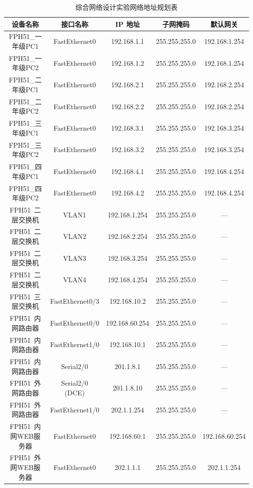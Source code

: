 \documentclass[UTF8,12pt,a4paper]{ctexart}
\begin{document}
\begin{table}[H]
\centering
\caption{综合网络设计实验网络地址规划表}
\renewcommand{\arraystretch}{1.2}
\begin{tabular}{ccccc}
\hline
设备名称 & 接口名称 & IP 地址 & 子网掩码 & 默认网关 \\
\hline

FPH51\_一年级PC1 & FastEthernet0 & 192.168.1.1 & 255.255.255.0 & 192.168.1.254 \\
FPH51\_一年级PC2 & FastEthernet0 & 192.168.1.2 & 255.255.255.0 & 192.168.1.254 \\

FPH51\_二年级PC1 & FastEthernet0 & 192.168.2.1 & 255.255.255.0 & 192.168.2.254 \\
FPH51\_二年级PC2 & FastEthernet0 & 192.168.2.2 & 255.255.255.0 & 192.168.2.254 \\

FPH51\_三年级PC1 & FastEthernet0 & 192.168.3.1 & 255.255.255.0 & 192.168.3.254 \\
FPH51\_三年级PC2 & FastEthernet0 & 192.168.3.2 & 255.255.255.0 & 192.168.3.254 \\

FPH51\_四年级PC1 & FastEthernet0 & 192.168.4.1 & 255.255.255.0 & 192.168.4.254 \\
FPH51\_四年级PC2 & FastEthernet0 & 192.168.4.2 & 255.255.255.0 & 192.168.4.254 \\


FPH51\ 二层交换机 & VLAN1 & 192.168.1.254 & 255.255.255.0 & — \\
FPH51\ 二层交换机 & VLAN2 & 192.168.2.254 & 255.255.255.0 & — \\
FPH51\ 二层交换机 & VLAN3 & 192.168.3.254 & 255.255.255.0 & — \\
FPH51\ 二层交换机 & VLAN4 & 192.168.4.254 & 255.255.255.0 & — \\
FPH51\ 三层交换机 & FastEthernet0/3 & 192.168.10.2 & 255.255.255.0 & — \\


FPH51\ 内网路由器 & FastEthernet0/0 & 192.168.60.254 & 255.255.255.0 & — \\
FPH51\ 内网路由器 & FastEthernet1/0 & 192.168.10.1 & 255.255.255.0 & — \\
FPH51\ 内网路由器 & Serial2/0 & 201.1.8.1 & 255.255.255.0 & — \\

FPH51\ 外网路由器 & Serial2/0 (DCE) & 201.1.8.10 & 255.255.255.0 & — \\
FPH51\ 外网路由器 & FastEthernet1/0 & 202.1.1.254 & 255.255.255.0 & — \\


FPH51\ 内网WEB服务器 & FastEthernet0 & 192.168.60.1 & 255.255.255.0 & 192.168.60.254 \\
FPH51\ 外网WEB服务器 & FastEthernet0 & 202.1.1.1 & 255.255.255.0 & 202.1.1.254 \\

\hline
\end{tabular}
\end{table}
\end{document}
